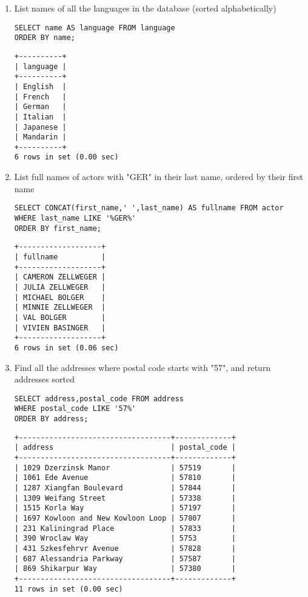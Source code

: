 \documentclass[]{article}
\begin{document}
\begin{enumerate}

\item List names of all the languages in the database (sorted alphabetically)
\begin{verbatim}
SELECT name AS language FROM language
ORDER BY name;
\end{verbatim}
\begin{verbatim}
+----------+
| language |
+----------+
| English  |
| French   |
| German   |
| Italian  |
| Japanese |
| Mandarin |
+----------+
6 rows in set (0.00 sec)
\end{verbatim}

\item List full names of actors with "GER" in their last name, ordered by their first name
\begin{verbatim}
SELECT CONCAT(first_name,' ',last_name) AS fullname FROM actor
WHERE last_name LIKE '%GER%'
ORDER BY first_name;
\end{verbatim}
\begin{verbatim}
+-------------------+
| fullname          |
+-------------------+
| CAMERON ZELLWEGER |
| JULIA ZELLWEGER   |
| MICHAEL BOLGER    |
| MINNIE ZELLWEGER  |
| VAL BOLGER        |
| VIVIEN BASINGER   |
+-------------------+
6 rows in set (0.06 sec)
\end{verbatim}

\item Find all the addresses where postal code starts with "57", and return addresses sorted
\begin{verbatim}
SELECT address,postal_code FROM address
WHERE postal_code LIKE '57%'
ORDER BY address;
\end{verbatim}
\begin{verbatim}
+-----------------------------------+-------------+
| address                           | postal_code |
+-----------------------------------+-------------+
| 1029 Dzerzinsk Manor              | 57519       |
| 1061 Ede Avenue                   | 57810       |
| 1287 Xiangfan Boulevard           | 57844       |
| 1309 Weifang Street               | 57338       |
| 1515 Korla Way                    | 57197       |
| 1697 Kowloon and New Kowloon Loop | 57807       |
| 231 Kaliningrad Place             | 57833       |
| 390 Wroclaw Way                   | 5753        |
| 431 Szkesfehrvr Avenue            | 57828       |
| 687 Alessandria Parkway           | 57587       |
| 869 Shikarpur Way                 | 57380       |
+-----------------------------------+-------------+
11 rows in set (0.00 sec)
\end{verbatim}


\end{enumerate}
\end{document}
